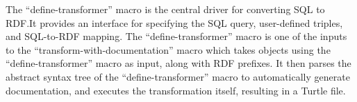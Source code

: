 The ``define-transformer'' macro is the central driver for converting SQL to RDF.\@  It provides an interface for specifying the SQL query, user-defined triples, and SQL-to-RDF mapping. The ``define-transformer'' macro is one of the inputs to the ``transform-with-documentation'' macro which takes objects using the ``define-transformer'' macro as input, along with RDF prefixes. It then parses the abstract syntax tree of the ``define-transformer'' macro to automatically generate documentation, and executes the transformation itself, resulting in a Turtle file.


